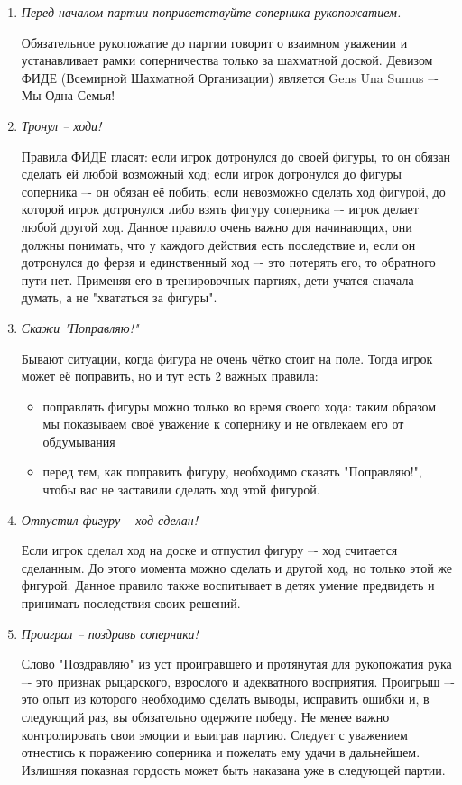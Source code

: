 \begin{enumerate}
\item \emph{Перед началом партии поприветствуйте соперника рукопожатием.}

Обязательное рукопожатие до партии говорит о взаимном уважении и устанавливает рамки соперничества только за шахматной доской. Девизом ФИДЕ (Всемирной Шахматной Организации) является Gens Una Sumus –- Мы Одна Семья!

\item \emph{Тронул – ходи!}

Правила ФИДЕ гласят: если игрок дотронулся до своей фигуры, то он обязан сделать ей любой возможный ход; если игрок дотронулся до фигуры соперника –- он обязан её побить; если невозможно сделать ход фигурой, до которой игрок дотронулся либо взять фигуру соперника –- игрок делает любой другой ход. Данное правило очень важно для начинающих, они должны понимать, что у каждого действия есть последствие и, если он дотронулся до ферзя и единственный ход –- это потерять его, то обратного пути нет. Применяя его в тренировочных партиях, дети учатся сначала думать, а не "хвататься за фигуры".
 
\item \emph{Скажи "Поправляю!"}

Бывают ситуации, когда фигура не очень чётко стоит на поле. Тогда игрок может её поправить, но и тут есть 2 важных правила:

\begin{itemize}
\item поправлять фигуры можно только во время своего хода: таким образом мы показываем своё уважение к сопернику и не отвлекаем его от обдумывания
\item перед тем, как поправить фигуру, необходимо сказать "Поправляю!", чтобы вас не заставили сделать ход этой фигурой.
\end{itemize}

\item \emph{Отпустил фигуру – ход сделан!}

Если игрок сделал ход на доске и отпустил фигуру –- ход считается сделанным. До этого момента можно сделать и другой ход, но только этой же фигурой. Данное правило также воспитывает в детях умение предвидеть и принимать последствия своих решений.

\item \emph{Проиграл – поздравь соперника!}

Слово "Поздравляю" из уст проигравшего и протянутая для рукопожатия рука –- это признак рыцарского, взрослого и адекватного восприятия. Проигрыш –- это опыт из которого необходимо сделать выводы, исправить ошибки и, в следующий раз, вы обязательно одержите победу. Не менее важно контролировать свои эмоции и выиграв партию. Следует с уважением отнестись к поражению соперника и пожелать ему удачи в дальнейшем. Излишняя показная гордость может быть наказана уже в следующей партии.


\end{enumerate}
